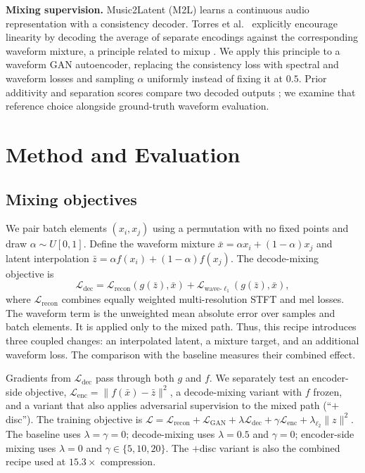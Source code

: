 \documentclass[conference]{IEEEtran}
\newcommand{\Ldec}{\mathcal{L}_\mathrm{dec}}
\newcommand{\Lenc}{\mathcal{L}_\mathrm{enc}}
\begin{document}
\textbf{Mixing supervision.} Music2Latent (M2L) \cite{pasini2024music2latent}
learns a continuous audio representation with a consistency decoder. Torres
et al.~\cite{torres2026linearity} explicitly encourage linearity by decoding
the average of separate encodings against the corresponding waveform
mixture, a principle related to mixup \cite{zhang2018mixup}. We apply this
principle to a waveform GAN autoencoder, replacing the consistency loss with
spectral and waveform losses and sampling $\alpha$ uniformly instead of
fixing it at $0.5$. Prior additivity and separation
scores compare two decoded outputs \cite{torres2026linearity}; we examine
that reference choice alongside ground-truth waveform evaluation.

\section{Method and Evaluation}\label{sec:method}

\subsection{Mixing objectives}\label{sec:loss}
We pair batch elements $(x_i,x_j)$ using a permutation with no fixed points
and draw $\alpha\sim U[0,1]$. Define the waveform mixture
$\bar{x}=\alpha x_i+(1{-}\alpha)x_j$ and latent interpolation
$\bar{z}=\alpha f(x_i)+(1{-}\alpha)f(x_j)$. The decode-mixing objective is
\begin{equation}
  \Ldec=\mathcal{L}_\mathrm{recon}\!\left(g(\bar{z}),\bar{x}\right)
  +\mathcal{L}_{\mathrm{wave}\text{-}\ell_1}\!\left(g(\bar{z}),\bar{x}\right),
  \label{eq:ldec}
\end{equation}
where $\mathcal{L}_\mathrm{recon}$ combines equally weighted
multi-resolution STFT and mel losses. The waveform term is the unweighted
mean absolute error over samples and batch elements. It is applied only to
the mixed path. Thus, this recipe introduces three coupled changes: an
interpolated latent, a mixture target, and an additional waveform loss.
The comparison with the baseline measures their combined effect.

Gradients from $\Ldec$ pass through both $g$ and $f$. We separately test an
encoder-side objective,
$\Lenc=\lVert f(\bar{x})-\bar{z}\rVert^2$, a decode-mixing variant with
$f$ frozen, and a variant that also applies adversarial supervision to the
mixed path (``$+$disc''). The training objective is
$\mathcal{L}=\mathcal{L}_\mathrm{recon}+\mathcal{L}_\mathrm{GAN}
+\lambda\Ldec+\gamma\Lenc+\lambda_{\ell_2}\lVert z\rVert^2$.
The baseline uses $\lambda=\gamma=0$; decode-mixing uses $\lambda=0.5$ and
$\gamma=0$; encoder-side mixing uses $\lambda=0$ and
$\gamma\in\{5,10,20\}$. The $+$disc variant is also the combined recipe
used at $15.3\times$ compression.
\end{document}
